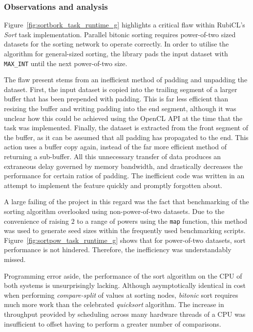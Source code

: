 \subsubsection{Observations and analysis}
Figure~\ref{fig:sortbork_task_runtime_g} highlights a critical flaw within RubiCL's \emph{Sort} task implementation.
Parallel bitonic sorting requires power-of-two sized datasets for the sorting network to operate correctly. In order to utilise the algorithm for general-sized sorting, the library pads the input dataset with \verb|MAX_INT| until the next power-of-two size.

The flaw present stems from an inefficient method of padding and unpadding the dataset. First, the input dataset is copied into the trailing segment of a larger buffer that has been prepended with padding. This is far less efficient than resizing the buffer and writing padding into the end segment, although it was unclear how this could be achieved using the \ac{OpenCL} \ac{API} at the time that the task was implemented. Finally, the dataset is extracted from the front segment of the buffer, as it can be assumed that all padding has propagated to the end. This action uses a buffer copy again, instead of the far more efficient method of returning a sub-buffer. All this unnecessary transfer of data produces an extraneous delay governed by memory bandwidth, and drastically decreases the performance for certain ratios of padding. The inefficient code was written in an attempt to implement the feature quickly and promptly forgotten about.

A large failing of the project in this regard was the fact that benchmarking of the sorting algorithm overlooked using non-power-of-two datasets. Due to the convenience of raising $2$ to a range of powers using the \verb|map| function, this method was used to generate seed sizes within the frequently used benchmarking scripts. Figure~\ref{fig:sortpow_task_runtime_g} shows that for power-of-two datasets, sort performance is not hindered. Therefore, the inefficiency was understandably missed.

Programming error aside, the performance of the sort algorithm on the \ac{CPU} of both systems is unsurprisingly lacking.
Although asymptotically identical in cost when performing \emph{compare-split} of values at sorting nodes, \emph{bitonic} sort requires much more work than the celebrated \emph{quicksort} algorithm. The increase in throughput provided by scheduling across many hardware threads of a \ac{CPU} was insufficient to offset having to perform a greater number of comparisons.

